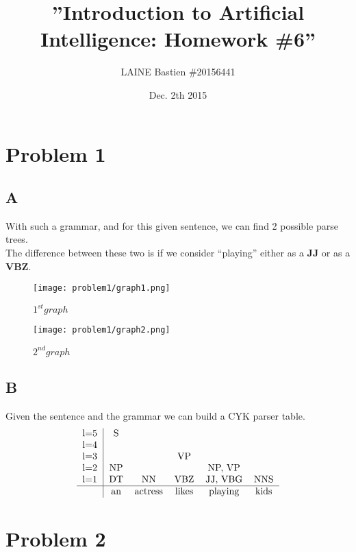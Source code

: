 \documentclass{article}
\begin{document}
\title{\textbf{''Introduction to Artificial Intelligence: Homework \#6''}}
\author{LAINE Bastien \#20156441}
\date{Dec. 2th 2015}
\maketitle
\tableofcontents

\newpage
    \section{Problem 1}
        \subsection{A}
            With such a grammar, and for this given sentence, we can find 2 possible parse trees.\\
            The difference between these two is if we consider ``playing'' either as a \textbf{JJ} or as a \textbf{VBZ}.
            \begin{figure}[H]
                \centering
                \texttt{[image: problem1/graph1.png]}
                \caption{$1^{st} graph$}
            \end{figure}
            \begin{figure}[H]
                \centering
                \texttt{[image: problem1/graph2.png]}
                \caption{$2^{nd} graph$}
            \end{figure}
        \subsection{B}
            Given the sentence and the grammar we can build a CYK parser table.
            \[
                \begin{tabular}{r|ccccccccc}
                    l=5 & S\\
                    l=4 &  &\\
                    l=3 &  &  & VP\\
                    l=2 & NP &  &  & NP, VP\\
                    l=1 & DT & NN & VBZ & JJ, VBG & NNS \\
                    \hline
                    & an & actress & likes & playing & kids \\
                \end{tabular}
            \]
    \newpage
    \section{Problem 2}
\end{document}
